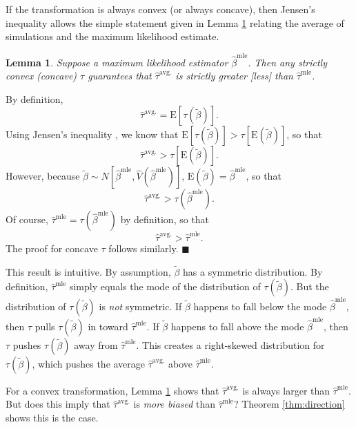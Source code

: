\documentclass[10pt]{article}
\newtheorem{lemma}{Lemma}
\newenvironment{proof}[1][Proof]{\begin{trivlist}
\item[\hskip \labelsep {\bfseries #1}]}{\end{trivlist}}
\begin{document}
If the transformation is always convex (or always concave), then Jensen's inequality allows the simple statement given in Lemma \ref{lem:direction} relating the average of simulations and the maximum likelihood estimate.

\begin{lemma}\label{lem:direction}
Suppose a maximum likelihood estimator $\hat{\beta}^\text{mle}$. 
Then any strictly convex (concave) $\tau$ guarantees that $\hat{\tau}^{\text{avg.}}$ is strictly greater [less] than $\hat{\tau}^\text{mle}$.
\end{lemma} 
\begin{proof}
By definition, $$ \hat{\tau}^{\text{avg.}} = \text{E}\left[ \tau \left(\tilde{\beta} \right) \right].$$
Using Jensen's inequality \citep[p. 190, Thm. 4.7.7]{CasellaBerger2002}, we know that $\text{E}\left[ \tau \left(\tilde{\beta} \right) \right] > \tau \left[ \text{E}\left( \tilde{\beta} \right) \right]$, so that $$\hat{\tau}^{\text{avg.}} > \tau \left[ \text{E}\left( \tilde{\beta} \right) \right].$$ 
However, because $\tilde{\beta} \sim N \left[ \hat{\beta}^{\text{mle}}, \hat{V} \left( \hat{\beta}^{\text{mle}} \right) \right]$, $\text{E}\left( \tilde{\beta} \right) = \hat{\beta}^\text{mle}$, so that 
$$\hat{\tau}^{\text{avg.}} > \tau \left( \hat{\beta}^\text{mle}\right).$$ 
Of course, $\hat{\tau}^\text{mle} = \tau \left( {\hat{\beta}^\text{mle}} \right)$ by definition, so that $$\hat{\tau}^{\text{avg.}} > \hat{\tau}^\text{mle}.$$ 
The proof for concave $\tau$ follows similarly.
 $\blacksquare$
\end{proof}
This result is intuitive. 
By assumption, $\tilde{\beta}$ has a symmetric distribution. 
By definition, $\hat{\tau}^\text{mle}$ simply equals the mode of the distribution of $\tau(\tilde{\beta})$.  
But the distribution of $\tau(\tilde{\beta})$ is \emph{not} symmetric.
If $\tilde{\beta}$ happens to fall below the mode $\hat{\beta}^\text{mle}$, then $\tau$ pulls $\tau(\tilde{\beta})$ in toward $\hat{\tau}^\text{mle}$. 
If $\tilde{\beta}$ happens to fall above the mode $\hat{\beta}^\text{mle}$, then $\tau$ pushes $\tau(\tilde{\beta})$ away from $\hat{\tau}^\text{mle}$. 
This creates a right-skewed distribution for $\tau(\tilde{\beta})$, which pushes the average $\hat{\tau}^\text{avg.}$ above $\hat{\tau}^\text{mle}$.

For a convex transformation, Lemma \ref{lem:direction} shows that $\hat{\tau}^\text{avg.}$ is always larger than $\hat{\tau}^\text{mle}$.
But does this imply that $\hat{\tau}^\text{avg.}$ is \textit{more biased} than $\hat{\tau}^\text{mle}$? Theorem \ref{thm:direction} shows this is the case.
\end{document}
